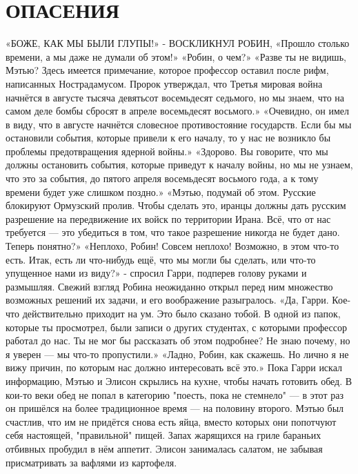 \documentclass[a4paper,12pt]{book}
\begin{document}
\chapter{ОПАСЕНИЯ}
	«БОЖЕ, КАК МЫ БЫЛИ ГЛУПЫ!» - ВОСКЛИКНУЛ РОБИН,
	«Прошло столько времени, а мы даже не думали об этом!»
	«Робин, о чем?»
	«Разве ты не видишь, Мэтью? Здесь имеется примечание, которое профессор оставил после рифм, написанных Нострадамусом. Пророк утверждал, что Третья мировая война начнётся в августе тысяча девятьсот восемьдесят седьмого, но мы знаем, что на самом деле бомбы сбросят в апреле восемьдесят восьмого.»
	«Очевидно, он имел в виду, что в августе начнётся словесное противостояние государств. Если бы мы остановили события, которые привели к его началу, то у нас не возникло бы проблемы предотвращения ядерной войны.»
	«Здорово. Вы говорите, что мы должны остановить события, которые приведут к началу войны, но мы не узнаем, что это за события, до пятого апреля восемьдесят восьмого года, а к тому времени будет уже слишком поздно.»
	«Мэтью, подумай об этом. Русские блокируют Ормузский пролив. Чтобы сделать это, иранцы должны дать русским разрешение на передвижение их войск по территории Ирана. Всё, что от нас требуется — это убедиться в том, что такое разрешение никогда не будет дано. Теперь понятно?»
	«Неплохо, Робин! Совсем неплохо! Возможно, в этом что-то есть. Итак, есть ли что-нибудь ещё, что мы могли бы сделать, или что-то упущенное нами из виду?» - спросил Гарри, подперев голову руками и размышляя.
	Свежий взгляд Робина неожиданно открыл перед ним множество возможных решений их задачи, и его воображение разыгралось.
	«Да, Гарри. Кое-что действительно приходит на ум. Это было сказано тобой. В одной из папок, которые ты просмотрел, были записи о других студентах, с которыми профессор работал до нас. Ты не мог бы рассказать об этом подробнее? Не знаю почему, но я уверен — мы что-то пропустили.»
	«Ладно, Робин, как скажешь. Но лично я не вижу причин, по которым нас должно интересовать всё это.»
	Пока Гарри искал информацию, Мэтью и Элисон скрылись на кухне, чтобы начать готовить обед.
	В кои-то веки обед не попал в категорию "поесть, пока не стемнело" — в этот раз он пришёлся на более традиционное время — на половину второго. Мэтью был счастлив, что им не придётся снова есть яйца, вместо которых они попотчуют себя настоящей, "правильной" пищей. Запах жарящихся на гриле бараньих отбивных пробудил в нём аппетит. Элисон занималась салатом, не забывая присматривать за вафлями из картофеля.
\end{document}
